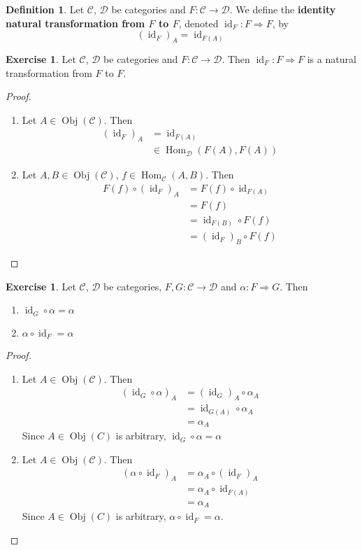 \documentclass[12pt]{amsart}
\theoremstyle{definition}
\newtheorem{defn}[definition]{Definition}
\newtheorem{ex}[definition]{Exercise}
\newcommand{\al}{\alpha}
\newcommand{\MC}{\mathcal{C}}
\newcommand{\MD}{\mathcal{D}}
\DeclareMathOperator{\id}{id}
\DeclareMathOperator{\Obj}{Obj}
\DeclareMathOperator{\Hom}{Hom}
\DeclareMathOperator*{\0}{\mbf{0}}
\DeclareMathOperator*{\1}{\mbf{1}}
\newcommand{\lex}[1]{\label{ex:#1}}
\newcommand{\ld}[1]{\label{defn:#1}}
\begin{document}
	\begin{defn} \ld{14003.2}
		Let $\MC$, $\MD$ be categories and $F: \MC \rightarrow \MD$. We define the \textbf{identity natural transformation from $F$ to $F$}, denoted $\id_{F}: F \Rightarrow F$, by 
		$$(\id_F)_A = \id_{F(A)}$$
	\end{defn}
	
	\begin{ex}  \lex{14003.3}
		Let $\MC$, $\MD$ be categories and $F: \MC \rightarrow \MD$. Then $\id_F: F \Rightarrow F$ is a natural transformation from $F$ to $F$.
	\end{ex}
	
	\begin{proof}\
		\begin{enumerate}
			\item Let $A \in \Obj(\MC)$. Then 
			\begin{align*}
				(\id_F)_A 
				& = \id_{F(A)} \\
				& \in \Hom_{\MD}(F(A), F(A))
			\end{align*}
			\item Let $A,B \in \Obj(\MC)$, $f \in \Hom_{\MC}(A,B)$. Then 
			\begin{align*}
				F(f) \circ (\id_{F})_{A} 
				& = F(f) \circ \id_{F(A)} \\
				& = F(f) \\
				& = \id_{F(B)} \circ F(f) \\
				& = (\id_{F})_{B} \circ F(f)
			\end{align*}
		\end{enumerate}
	\end{proof}

	\begin{ex} \lex{14003.4}
		Let $\MC$, $\MD$ be categories, $F,G: \MC \rightarrow \MD$ and $\al : F \Rightarrow G$. Then 
		\begin{enumerate}
			\item $\id_{G} \circ \al = \al$
			\item $\al \circ \id_F = \al$
		\end{enumerate} 
	\end{ex}

	\begin{proof}\
		\begin{enumerate}
			\item Let $A \in \Obj(\MC)$. Then 
			\begin{align*}
				(\id_{G} \circ \al)_{A}
				& = (\id_G)_A \circ \al_A \\
				& = \id_{G(A)} \circ \al_A \\
				& = \al_A 
			\end{align*}
			Since $A \in \Obj(C)$ is arbitrary, $\id_{G} \circ \al = \al$
			\item Let $A \in \Obj(\MC)$. Then
			\begin{align*}
				(\al \circ \id_F)_{A}
				& = \al_A \circ (\id_F)_A \\
				& = \al_A \circ \id_{F(A)} \\
				& = \al_A 
			\end{align*}
			Since $A \in \Obj(C)$ is arbitrary, $\al \circ \id_F = \al$.
		\end{enumerate}
	\end{proof}
\end{document}
